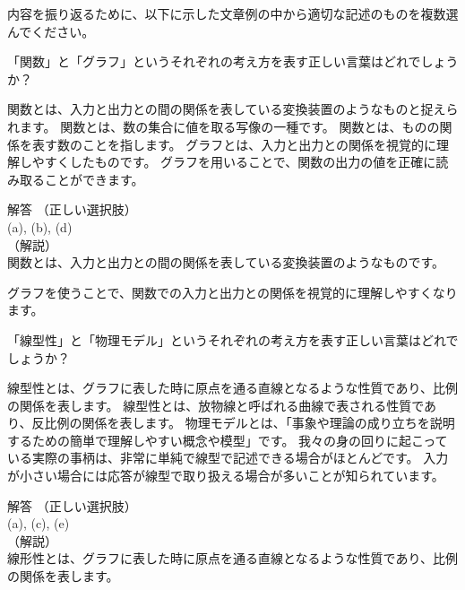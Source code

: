 \documentclass[uplatex,dvipdfmx,a4paper,11pt]{jsarticle}
\begin{document}
内容を振り返るために、以下に示した文章例の中から適切な記述のものを複数選んでください。
\begin{qlist}
	\qitem 「関数」と「グラフ」というそれぞれの考え方を表す正しい言葉はどれでしょうか？
		\begin{qlist2}
			\qitem 関数とは、入力と出力との間の関係を表している変換装置のようなものと捉えられます。
			\qitem 関数とは、数の集合に値を取る写像の一種です。
			\qitem 関数とは、ものの関係を表す数のことを指します。
			\qitem グラフとは、入力と出力との関係を視覚的に理解しやすくしたものです。
			\qitem グラフを用いることで、関数の出力の値を正確に読み取ることができます。
		\end{qlist2}
    \vspace{3mm}
    \begin{itembox}[l]{解答}
        （正しい選択肢）\\
        (a), (b), (d)\\
        （解説）\\
        関数とは、入力と出力との間の関係を表している変換装置のようなものです。

        グラフを使うことで、関数での入力と出力との関係を視覚的に理解しやすくなります。
    \end{itembox}
	\qitem 「線型性」と「物理モデル」というそれぞれの考え方を表す正しい言葉はどれでしょうか？
		\begin{qlist2}
			\qitem 線型性とは、グラフに表した時に原点を通る直線となるような性質であり、比例の関係を表します。
			\qitem 線型性とは、放物線と呼ばれる曲線で表される性質であり、反比例の関係を表します。
			\qitem 物理モデルとは、「事象や理論の成り立ちを説明するための簡単で理解しやすい概念や模型」です。
			\qitem 我々の身の回りに起こっている実際の事柄は、非常に単純で線型で記述できる場合がほとんどです。
			\qitem 入力が小さい場合には応答が線型で取り扱える場合が多いことが知られています。
    \end{qlist2}
    \vspace{3mm}
    \begin{itembox}[l]{解答}
        （正しい選択肢）\\
        (a), (c), (e)\\
        （解説）\\
        線形性とは、グラフに表した時に原点を通る直線となるような性質であり、比例の関係を表します。
        

\end{itembox}
\end{qlist}
\end{document}
